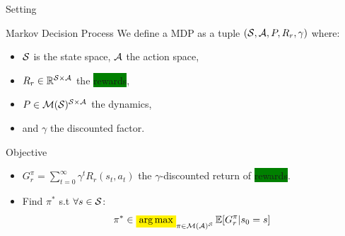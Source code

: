 \documentclass{beamer}
\newcommand{\mathcolorbox}[2]{\colorbox{#1}{$\displaystyle #2$}}
\begin{document}
    \begin{frame}{Setting}
        \begin{block}{Markov Decision Process}
            We define a MDP as a tuple $(\mathcal{S}, \mathcal{A}, P, R_r, \gamma)$ where:
            \begin{itemize}
                \pause\item  $\mathcal{S}$ is the state space, $\mathcal{A}$ the action space,
                \pause\item $R_r\in\mathbb{R}^{\mathcal{S} \times \mathcal{A}}$ the \colorbox{green}{rewards},
                \pause\item $P\in \mathcal{M}(\mathcal{S})^{\mathcal{S} \times \mathcal{A}}$ the dynamics, %
                \pause\item and $\gamma$ the discounted factor.
            \end{itemize}
        \end{block}
        \pause
        \begin{block}{Objective}
            \begin{itemize}
                \pause\item $G_r^\pi = \sum_{t=0}^\infty \gamma^t R_r(s_t, a_t)$ the $\gamma$-discounted return of \colorbox{green}{rewards}.
                \pause\item Find $\pi^*$ s.t $\forall s\in\mathcal{S}$:
                \begin{equation}
                    \label{eq:mdp}
                    \begin{array}{lcr}
                        \displaystyle \pi^* \in \mathcolorbox{yellow}{\argmax}_{\pi\in\cM(\cA)^\cS} \expectedvalue[G_r^\pi | s_0=s]
                    \end{array}
                \end{equation}

            \end{itemize}
        \end{block}
    \end{frame}
\end{document}
